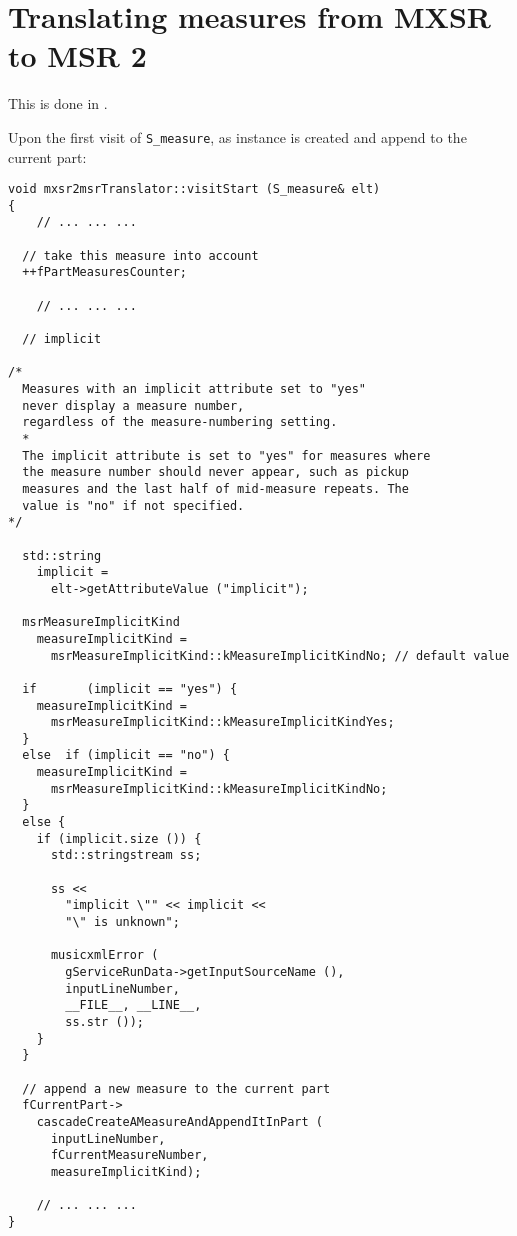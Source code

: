 

\section{Translating measures from MXSR to MSR 2}

This is done in \mxsrToMsr{}.

Upon the first visit of {\tt S_measure}, as  instance is created and append to the current part:
\begin{lstlisting}[language=CPlusPlus]
void mxsr2msrTranslator::visitStart (S_measure& elt)
{
	// ... ... ...

  // take this measure into account
  ++fPartMeasuresCounter;

	// ... ... ...

  // implicit

/*
  Measures with an implicit attribute set to "yes"
  never display a measure number,
  regardless of the measure-numbering setting.
  *
  The implicit attribute is set to "yes" for measures where
  the measure number should never appear, such as pickup
  measures and the last half of mid-measure repeats. The
  value is "no" if not specified.
*/

  std::string
    implicit =
      elt->getAttributeValue ("implicit");

  msrMeasureImplicitKind
    measureImplicitKind =
      msrMeasureImplicitKind::kMeasureImplicitKindNo; // default value

  if       (implicit == "yes") {
    measureImplicitKind =
      msrMeasureImplicitKind::kMeasureImplicitKindYes;
  }
  else  if (implicit == "no") {
    measureImplicitKind =
      msrMeasureImplicitKind::kMeasureImplicitKindNo;
  }
  else {
    if (implicit.size ()) {
      std::stringstream ss;

      ss <<
        "implicit \"" << implicit <<
        "\" is unknown";

      musicxmlError (
        gServiceRunData->getInputSourceName (),
        inputLineNumber,
        __FILE__, __LINE__,
        ss.str ());
    }
  }

  // append a new measure to the current part
  fCurrentPart->
    cascadeCreateAMeasureAndAppendItInPart (
      inputLineNumber,
      fCurrentMeasureNumber,
      measureImplicitKind);

	// ... ... ...
}
\end{lstlisting}

